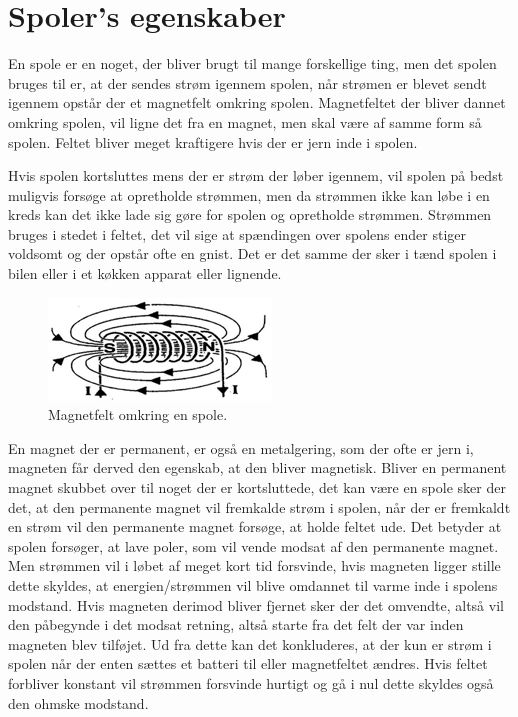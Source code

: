 \section{Spoler's egenskaber}

En spole er en noget, der bliver brugt til mange forskellige ting, men det spolen bruges til er, at der sendes strøm igennem spolen, når strømen er blevet sendt igennem opstår der et magnetfelt omkring spolen. Magnetfeltet der bliver dannet omkring spolen, vil ligne det fra en magnet, men skal være af samme form så spolen. Feltet bliver meget kraftigere hvis der er jern inde i spolen. 

Hvis spolen kortsluttes mens der er strøm der løber igennem, vil spolen på bedst muligvis forsøge at opretholde strømmen, men da strømmen ikke kan løbe i en kreds kan det ikke lade sig gøre for spolen og opretholde strømmen.  Strømmen bruges i stedet i feltet, det vil sige at spændingen over spolens ender stiger voldsomt og der opstår ofte en gnist. Det er det samme der sker i tænd spolen i bilen eller i et køkken apparat eller lignende.

\begin{figure}[htbp]
	\centering
	\includegraphics[width=0.5
	\textwidth]{Vildledning/Schematics/magnetfelt_omkring_en_spole.png}
	\caption{Magnetfelt omkring en spole.\cite{spoler}}
	\label{spole1}
\end{figure}

En magnet der er permanent, er også en metalgering, som der ofte er jern i, magneten får derved den egenskab, at den bliver magnetisk.  Bliver en permanent magnet skubbet over til noget der er kortsluttede, det kan være en spole sker der det, at den permanente magnet vil fremkalde strøm i spolen, når der er fremkaldt en strøm vil den permanente magnet forsøge, at holde feltet ude. Det betyder at spolen forsøger, at lave poler, som vil vende modsat af den permanente magnet. Men strømmen vil i løbet af meget kort tid forsvinde, hvis magneten ligger stille dette skyldes, at energien/strømmen vil blive omdannet til varme inde i spolens modstand. Hvis magneten derimod bliver fjernet sker der det omvendte, altså vil den påbegynde i det modsat retning, altså starte fra det felt der var inden magneten blev tilføjet. Ud fra dette kan det konkluderes, at der kun er strøm i spolen når der enten sættes et batteri til eller magnetfeltet ændres. Hvis feltet forbliver konstant vil strømmen forsvinde hurtigt og gå i nul dette skyldes også den ohmske modstand. 

